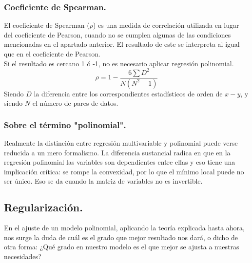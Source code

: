 \documentclass[a4paper,11pt]{article}
\begin{document}
\subsubsection{Coeficiente de Spearman.}

El coeficiente de Spearman ($\rho$) es una medida de correlación utilizada en lugar del coeficiente de Pearson, cuando no se cumplen algunas de las condiciones mencionadas en el apartado anterior. El resultado de este se interpreta al igual que en el coeficiente de Pearson. \\

\noindent
Si el resultado es cercano 1 ó -1, no es necesario aplicar regresión polinomial.
\begin{equation}
\rho = 1 - \frac{6\sum D^2}{N(N^2 - 1)}
\end{equation}
Siendo $D$  la diferencia entre los correspondientes estadísticos de orden de $x- y$, y siendo $N$ el número de pares de datos.

\subsubsection{Sobre el término "polinomial".}

\indent
Realmente la distinción entre regresión multivariable y polinomial puede verse reducida a un mero formalismo. La diferencia sustancial radica en que en la regresión polinomial las variables son dependientes entre ellas y eso tiene una implicación crítica: se rompe la convexidad, por lo que el mínimo local puede no ser único. Eso se da cuando la matriz de variables no es invertible.
\subsection{Regularización.}

En el ajuste de un modelo polinomial, aplicando la teoría explicada hasta ahora, nos surge la duda de cuál es el grado que mejor resultado nos dará, o dicho de otra forma: ¿Qué grado en nuestro modelo es el que mejor se ajusta a nuestras necesidades?\\
\end{document}
